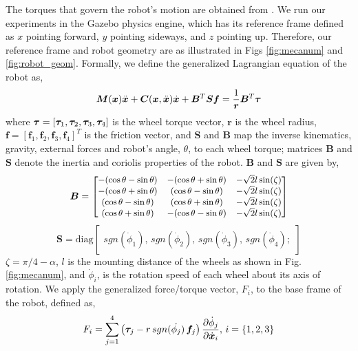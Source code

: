 %
The torques that govern the robot's motion are obtained from \cite{mecanum}. We run our experiments in the Gazebo physics engine, which has its reference frame defined as $x$ pointing forward, $y$ pointing sideways, and $z$ pointing up. Therefore, our reference frame and robot geometry are as illustrated in Figs \ref{fig:mecanum} and \ref{fig:robot_geom}. Formally, we define the generalized Lagrangian equation of the robot as,
\begin{align}
\bm{M}(\bm{x})\ddot{\bm{x}} + \bm{C}(\bm{x}, \ddot{\bm{x}}) \dot{\bm{x}} + \bm{B}^T \bm{S} \bm{f} = \frac{1}{\bm{r}}\bm{B}^T \bm{\tau}
\label{eq:inverse_dyn}
\end{align}
%
where $\bm{\tau} = [\bm{\tau}_1, \bm{\tau}_2, \bm{\tau}_3, \bm{\tau}_4]$ is the wheel torque vector, $\bm{r}$ is the wheel radius, $\bm{f} = [\bm{f}_1, \bm{f}_2, \bm{f}_3, \bm{f}_4]^T$ is the friction vector, and $\bm{S}$ and $\bm{B}$ map the inverse kinematics, gravity, external forces and robot's angle, $\theta$, %
to each wheel torque; matrices $\bm{B}$ and $\bm{S}$ denote the inertia and coriolis properties of the robot. $\bm{B}$ and $\bm{S}$  are given by,
%
\[
\small
\bm{B} =
\begin{bmatrix}
-(\cos \theta - \sin \theta) & -(\cos \theta + \sin \theta) & -\sqrt{2}l \sin(\zeta) \\
-(\cos \theta + \sin \theta) & (\cos \theta - \sin \theta) &- \sqrt{2}l \sin(\zeta) \\
(\cos \theta - \sin \theta) & (\cos \theta + \sin \theta)  & -\sqrt{2}l \sin(\zeta) \\
(\cos \theta + \sin \theta) & -(\cos \theta - \sin \theta)  & -\sqrt{2}l \sin(\zeta)
\end{bmatrix}
\]
%
\[
\bm{S} = \text{diag} \begin{bmatrix}
sgn(\dot{\phi}_1), \,  sgn(\dot{\phi}_2),  \, sgn(\dot{\phi}_3), \,  sgn(\dot{\phi}_4);
\end{bmatrix}
\]
$\zeta=\pi/4 - \alpha$, $l$ is the mounting distance of the wheels as shown in  Fig. \autoref{fig:mecanum}, and
$\dot{\phi}_i$, is the rotation speed of each wheel about its axis of rotation. We apply the generalized force/torque vector, $F_{i}$, to the base frame of the robot, defined as, %
\begin{align}
F_{i} = \sum_{j=1}^{4}\left(\bm{\tau}_j - r \, sgn(\dot{\phi_j}) \, \bm{f}_j\right)\frac{\partial \dot{\phi}_j}{\partial \dot{\bm{x}}_i}, \, i = \{1,2,3\}
\end{align}

